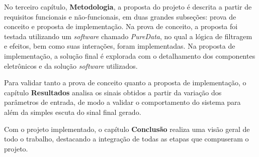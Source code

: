 No terceiro capítulo, \textbf{Metodologia}, a proposta do projeto é descrita a partir de requisitos funcionais e não-funcionais, %
em duas grandes subseções: prova de conceito e proposta de implementação.
Na prova de conceito, a proposta foi testada utilizando um \textit{software} chamado \textit{PureData}, no qual a lógica de filtragem e efeitos, bem como suas interações, foram implementadas. %
Na proposta de implementação, a solução final é explorada com o detalhamento dos componentes eletrônicos e da solução \textit{software} utilizados.

Para validar tanto a prova de conceito quanto a proposta de implementação, o capítulo \textbf{Resultados} analisa os sinais obtidos a partir da variação dos parâmetros de entrada, de modo a validar o comportamento do sistema para além da simples escuta do sinal final gerado. %

Com o projeto implementado, o capítulo \textbf{Conclusão} realiza uma visão geral de todo o trabalho, destacando a integração de todas as etapas que compuseram o projeto. %